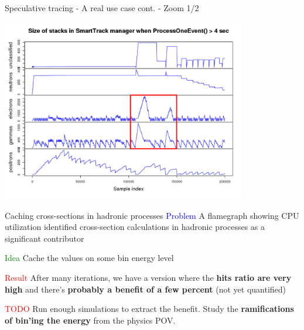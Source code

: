 \documentclass{beamer}
\begin{document}
\begin{frame}{Speculative tracing - A real use case cont. - Zoom 1/2}

\begin{center}
  \includegraphics[width=0.8\textwidth]{pathol-zoom1.png}
\end{center}
\end{frame}


\begin{frame}{Caching cross-sections in hadronic processes}
\textcolor{blue}{Problem} A flamegraph showing CPU utilization identified
cross-section calculations in hadronic processes as a significant contributor

\vspace{5mm}

\textcolor{green}{Idea} Cache the values on some bin energy level

\vspace{5mm}

\textcolor{red}{Result} After many iterations, we have a version where the {\bf hits
ratio are very high} and there's {\bf probably a benefit of a few percent} (not yet quantified)

\vspace{5mm}

\textcolor{red}{TODO} Run enough simulations to extract the benefit. Study the
{\bf ramifications of bin'ing the energy} from the physics POV.

\end{frame}
\end{document}
